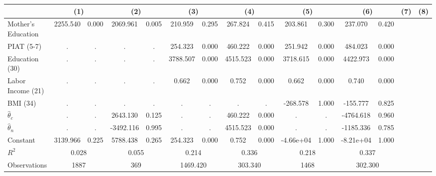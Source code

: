 \begin{tabular}{lcccccccccccc} \toprule
 & \multicolumn{2}{c}{(1)}  &  \multicolumn{2}{c}{(2)}  &  \multicolumn{2}{c}{(3)}  &  \multicolumn{2}{c}{(4)}  & \multicolumn{2}{c}{(5)} & \multicolumn{2}{c}{(6)}  & \multicolumn{2}{c}{(7)} &  \multicolumn{2}{c}{(8)}  \\  \midrule
Mother's Education &  2255.540 &     0.000 &  2069.961 &     0.005 &   210.959 &     0.295 &   267.824 &     0.415 &   203.861 &     0.300 &   237.070 &     0.420 \\  
PIAT (5-7) &         . &         . &         . &         . &   254.323 &     0.000 &   460.222 &     0.000 &   251.942 &     0.000 &   484.023 &     0.000 \\  
Education (30) &         . &         . &         . &         . &  3788.507 &     0.000 &  4515.523 &     0.000 &  3718.615 &     0.000 &  4422.973 &     0.000 \\  
Labor Income (21) &         . &         . &         . &         . &     0.662 &     0.000 &     0.752 &     0.000 &     0.662 &     0.000 &     0.740 &     0.000 \\  
BMI (34) &         . &         . &         . &         . &         . &         . &         . &         . &  -268.578 &     1.000 &  -155.777 &     0.825 \\  
$\hat{\theta}_{c}$&         . &         . &  2643.130 &     0.125 &         . &         . &   460.222 &     0.000 &         . &         . & -4764.618 &     0.960 \\  
$\hat{\theta}_{n}$ &         . &         . & -3492.116 &     0.995 &         . &         . &  4515.523 &     0.000 &         . &         . & -1185.336 &     0.785 \\  
Constant &  3139.966 &     0.225 &  5788.438 &     0.265 &   254.323 &     0.000 &     0.752 &     0.000 & -4.66e+04 &     1.000 & -8.21e+04 &     1.000 \\  
$R^2$ &     \multicolumn{2}{c}{0.028} &     \multicolumn{2}{c}{0.055} &    \multicolumn{2}{c}{0.214} &  \multicolumn{2}{c}{0.336} &  \multicolumn{2}{c}{0.218} &  \multicolumn{2}{c}{0.337} \\  
Observations &  \multicolumn{2}{c}{1887} &   \multicolumn{2}{c}{369} &  \multicolumn{2}{c}{1469.420} &     \multicolumn{2}{c}{303.340} &     \multicolumn{2}{c}{1468} & \multicolumn{2}{c}{302.300}  \\ \bottomrule \end{tabular}
